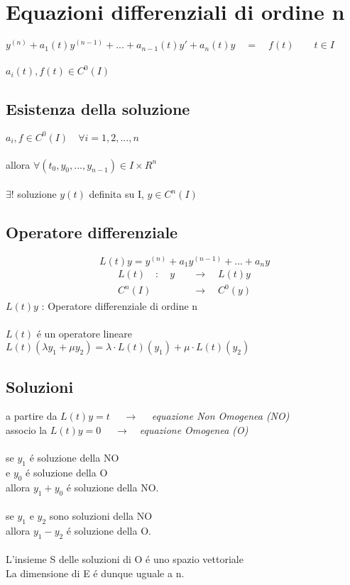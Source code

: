 \documentclass[a4paper,10pt,italian]{article}
\begin{document}
\section{Equazioni differenziali di ordine n}
$y^{(n)} + a_1(t)y^{(n-1)} + ... + a_{n-1}(t)y' + a_n(t)y \quad = \quad f(t) \qquad t \in I$ \\ \\
$a_i(t), f(t) \in C^0(I) $ 

\subsection{Esistenza della soluzione}
$a_i, f \in C^0(I) \quad \forall i = 1,2,...,n$ \\ \\
allora $\forall(t_0, y_0, ..., y_{n-1})\in I \times R^n$ \\ \\
$ \exists ! $ soluzione $y(t)$ definita su I, $y\in C^n(I)$

\subsection{Operatore differenziale}
$$ L(t)y = y^{(n)} + a_1y^{(n-1)} + ... + a_ny $$
\begin{align*}
L(t)\quad : \quad y \quad &\rightarrow \quad L(t)y \\
C^{n}(I) \quad &\rightarrow \quad C^0(y)
\end{align*}
$L(t)y$ : Operatore differenziale di ordine n \\ 
\\
$L(t)$ \'e un operatore lineare \\
$L(t)(\lambda y_1 + \mu y_2) = \lambda \cdot L(t)(y_1) + \mu \cdot L(t)(y_2) $ \\ 

\subsection{Soluzioni}
a partire da $L(t)y = t$ $\quad \longrightarrow \quad$ \emph{equazione Non Omogenea (NO)} \\
associo la $L(t)y = 0$ $\quad \longrightarrow \quad$\emph{equazione Omogenea (O)} \\
\\
se $y_1$ \'e soluzione della NO \\
e $y_0$ \'e soluzione della O \\
allora $y_1+y_0$ \'e soluzione della NO.\\
\\
se $y_1$ e $y_2$ sono soluzioni della NO \\
allora $y_1-y_2$ \'e soluzione della O.\\
\\
L'insieme S delle soluzioni di O \'e uno spazio vettoriale\\
La dimensione di E \'e dunque uguale a n.
\end{document}
